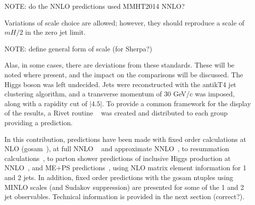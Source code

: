 NOTE: do the NNLO predictions used MMHT2014 NNLO? 

Variations of scale choice are allowed; however, they should reproduce a scale of $mH/2$ in the zero jet 
limit. 

NOTE: define general form of scale (for Sherpa?)

Alas, in some cases, there are deviations from these standards. These will be 
noted where present, and the impact on the comparisons will be discussed. 
The Higgs boson was left undecided. Jets were reconstructed with the antikT4 jet 
clustering algorithm, and a transverse momentum of 30 GeV/c was imposed, along with 
a rapidity cut of $|4.5|$. 
To provide a common framework for the display of the results, a Rivet routine ~\cite{Rivet_routine} was created and distributed to each group providing a prediction. 

In this contribution, predictions have been made with fixed order calculations at NLO 
(gosam~\cite{gosam}), at full NNLO ~\cite{Petriello} and approximate NNLO~\cite{LoopSim}, 
to resummation calculations~\cite{HqT, HEJ, etc}, to parton shower predictions of
inclusive Higgs production at NNLO~\cite{PowhegNNLOPS, SherpaNNLOPS}, and ME+PS
predictions~\cite{MG5,Sherpa,Herwig7}, using NLO matrix element information for 1 and 2
jets. In addition, fixed order predictions with the gosam ntuples using MINLO scales (and Sudakov suppression)  are presented for 
some of the 1 and 2 jet observables.  Technical information is provided in the next section (correct?). 
